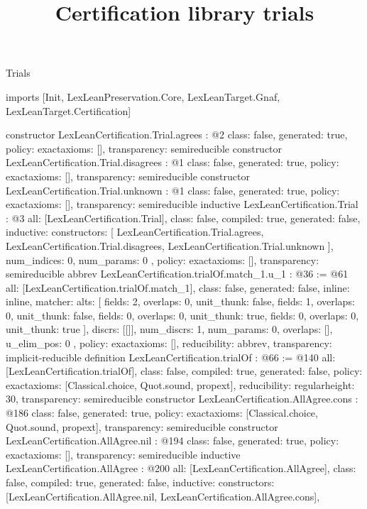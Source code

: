 \begin{lexlean}{Trials}
\title{Certification library trials}
\begin{coremodule}
imports [Init, LexLeanPreservation.Core, LexLeanTarget.Gnaf, LexLeanTarget.Certification]

constructor LexLeanCertification.Trial.agrees : @2 {
  class: false,
  generated: true,
  policy: exact{axioms: []},
  transparency: semireducible
}
constructor LexLeanCertification.Trial.disagrees : @1 {
  class: false,
  generated: true,
  policy: exact{axioms: []},
  transparency: semireducible
}
constructor LexLeanCertification.Trial.unknown : @1 {
  class: false,
  generated: true,
  policy: exact{axioms: []},
  transparency: semireducible
}
inductive LexLeanCertification.Trial : @3 {
  all: [LexLeanCertification.Trial],
  class: false,
  compiled: true,
  generated: false,
  inductive: {
    constructors: [
      LexLeanCertification.Trial.agrees,
      LexLeanCertification.Trial.disagrees,
      LexLeanCertification.Trial.unknown
    ],
    num_indices: 0,
    num_params: 0
  },
  policy: exact{axioms: []},
  transparency: semireducible
}
abbrev LexLeanCertification.trialOf.match_1.{u_1} : @36 := @61 {
  all: [LexLeanCertification.trialOf.match_1],
  class: false,
  generated: false,
  inline: inline,
  matcher: {
    alts: [
      {fields: 2, overlaps: 0, unit_thunk: false},
      {fields: 1, overlaps: 0, unit_thunk: false},
      {fields: 0, overlaps: 0, unit_thunk: true},
      {fields: 0, overlaps: 0, unit_thunk: true}
    ],
    discrs: [[]],
    num_discrs: 1,
    num_params: 0,
    overlaps: [],
    u_elim_pos: 0
  },
  policy: exact{axioms: []},
  reducibility: abbrev{},
  transparency: implicit-reducible
}
definition LexLeanCertification.trialOf : @66 := @140 {
  all: [LexLeanCertification.trialOf],
  class: false,
  compiled: true,
  generated: false,
  policy: exact{axioms: [Classical.choice, Quot.sound, propext]},
  reducibility: regular{height: 30},
  transparency: semireducible
}
constructor LexLeanCertification.AllAgree.cons : @186 {
  class: false,
  generated: true,
  policy: exact{axioms: [Classical.choice, Quot.sound, propext]},
  transparency: semireducible
}
constructor LexLeanCertification.AllAgree.nil : @194 {
  class: false,
  generated: true,
  policy: exact{axioms: []},
  transparency: semireducible
}
inductive LexLeanCertification.AllAgree : @200 {
  all: [LexLeanCertification.AllAgree],
  class: false,
  compiled: true,
  generated: false,
  inductive: {
    constructors: [LexLeanCertification.AllAgree.nil, LexLeanCertification.AllAgree.cons],
}}
\end{coremodule}
\end{lexlean}
